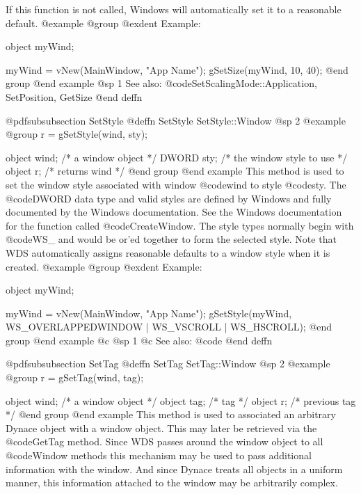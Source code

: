 If this function is not called, Windows will automatically set it to a
reasonable default.
@example
@group
@exdent Example:

object  myWind;

myWind = vNew(MainWindow, "App Name");
gSetSize(myWind, 10, 40);
@end group
@end example
@sp 1
See also:  @code{SetScalingMode::Application, SetPosition, GetSize}
@end deffn









@pdfsubsubsection {SetStyle}
@deffn {SetStyle} SetStyle::Window
@sp 2
@example
@group
r = gSetStyle(wind, sty);

object  wind;   /*  a window object             */
DWORD   sty;    /*  the window style to use     */
object  r;      /*  returns wind                */
@end group
@end example
This method is used to set the window style associated with window
@code{wind} to style @code{sty}.  The @code{DWORD} data type and valid 
styles are defined by Windows and fully documented by the Windows
documentation.  See the Windows documentation for the function called
@code{CreateWindow}.  The style types normally begin with @code{WS_}
and would be or'ed together to form the selected style.
Note that WDS automatically assigns reasonable defaults to a window
style when it is created.
@example
@group
@exdent Example:

object  myWind;

myWind = vNew(MainWindow, "App Name");
gSetStyle(myWind, WS_OVERLAPPEDWINDOW | WS_VSCROLL | WS_HSCROLL);
@end group
@end example
@c @sp 1
@c See also:  @code{}
@end deffn








@pdfsubsubsection {SetTag}
@deffn {SetTag} SetTag::Window
@sp 2
@example
@group
r = gSetTag(wind, tag);

object  wind;   /*  a window object   */
object  tag;    /*  tag               */
object  r;      /*  previous tag      */
@end group
@end example
This method is used to associated an arbitrary Dynace object with a
window object.  This may later be retrieved via the @code{GetTag} method.
Since WDS passes around the window object to all @code{Window} methods
this mechanism may be used to pass additional information with the
window.  And since Dynace treats all objects in a uniform manner, this
information attached to the window may be arbitrarily complex.

